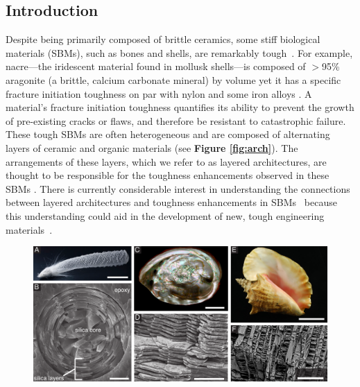 \documentclass[12pt,onecolumn]{article}
\begin{document}
\begin{bibunit}
\doublespacing
\section*{Introduction}
Despite being primarily composed of brittle ceramics, some stiff biological materials (SBMs), such as bones and shells, are remarkably tough~\cite{ritchie2011conflicts, wegst2015bioinspired, wang2001, gao2017mass}. For example, nacre---the iridescent material found in mollusk shells---is composed of $>$95\% aragonite (a brittle, calcium carbonate mineral) by volume yet it has a specific fracture initiation toughness on par with nylon and some iron alloys \cite{gao2017mass}. A material's fracture initiation toughness quantifies its ability to prevent the growth of pre-existing cracks or flaws, and therefore be resistant to catastrophic failure. These tough SBMs are often heterogeneous and are composed of alternating layers of ceramic and organic materials (see {\bf Figure \ref{fig:arch}}). The arrangements of these layers, which we refer to as layered architectures, are thought to be responsible for the toughness enhancements observed in these SBMs \cite{mayer2011new}. There is currently considerable interest in understanding the connections between layered architectures and toughness enhancements in SBMs~\cite{mayer2011new,mayer2005rigid,rabiei2010failure, kolednik2011bioinspired} because this understanding could aid in the development of new, tough engineering materials~\cite{munch2008tough,karambelas2013strombus,gao2017mass}.
%
			\begin{figure}[ht!]
			\centering
			\includegraphics[width=\textwidth]{../Figures/FigureArchEx/Figure1_V4.pdf}

\end{figure}
\end{bibunit}
\end{document}
